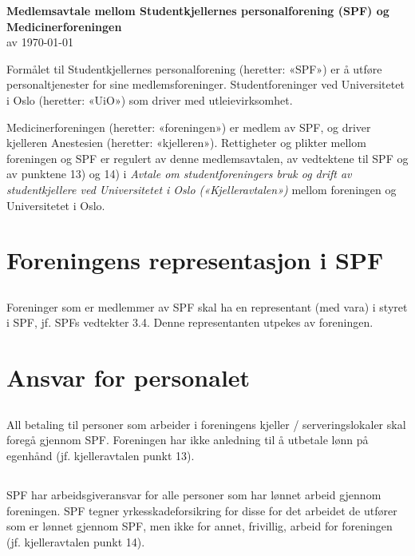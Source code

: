 \documentclass[12pt]{article}
\begin{document}
\pagestyle{fancy}
\fancyhf{}

\begin{center}
    {\LARGE\textbf{Medlemsavtale mellom Studentkjellernes personalforening
    (SPF) og Medicinerforeningen}}\\[7pt]
    av \today\\[24pt]
\end{center}

Formålet til Studentkjellernes
personalforening (heretter: «SPF») er å utføre 
personaltjenester for sine medlemsforeninger. Studentforeninger ved Universitetet i Oslo
(heretter: «UiO») som driver med utleievirksomhet.

Medicinerforeningen (heretter: «foreningen»)
er medlem av SPF, og driver kjelleren Anestesien (heretter: «kjelleren»). Rettigheter og plikter mellom 
foreningen og SPF er regulert av denne 
medlemsavtalen, av vedtektene til SPF og av punktene 13) og 
14) i \textit{Avtale om studentforeningers bruk og drift av 
studentkjellere ved Universitetet i Oslo
(«Kjelleravtalen»)} mellom foreningen og 
Universitetet i Oslo.
\section{Foreningens representasjon i SPF}
\label{sec:1}
\subsection{}
\label{sub:1.1}
Foreninger som er medlemmer av SPF skal ha en 
representant (med vara) i styret i SPF, jf. SPFs 
vedtekter 3.4. Denne representanten utpekes av 
foreningen.
\section{Ansvar for personalet}
\label{sec:2}
\subsection{}
\label{sub:2.1}
All betaling til personer som arbeider i foreningens kjeller / serveringslokaler
skal foregå gjennom SPF. Foreningen har ikke anledning til å utbetale lønn på egenhånd 
(jf. kjelleravtalen punkt 13).
\subsection{}
\label{sub:2.2}
SPF har arbeidsgiveransvar for alle personer som 
har lønnet arbeid gjennom foreningen. SPF tegner 
yrkesskadeforsikring for disse for det arbeidet de 
utfører som er lønnet gjennom SPF, men ikke for 
annet, frivillig, arbeid for foreningen (jf. 
kjelleravtalen punkt 14).
\end{document}
